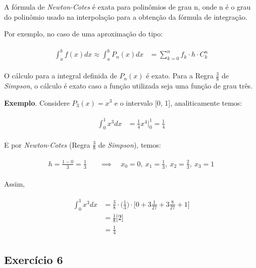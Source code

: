 \documentclass[paper=a4, fontsize=12pt]{scrartcl}
\numberwithin{equation}{section} %
\numberwithin{figure}{section} %
\numberwithin{table}{section} %
\begin{document}
		A fórmula de \textit{Newton-Cotes} é exata para polinômios de grau n, onde n é o grau do polinômio usado na interpolação para a obtenção da fórmula de integração.

		Por exemplo, no caso de uma aproximação do tipo:

		\begin{align*}
			\begin{split}
				\int_{a}^{b} f(x) dx \approx \int_{a}^{b} P_n(x) dx &= \sum_{k=0}^{n} f_k \cdot h \cdot C_k^n
			\end{split}
		\end{align*}

		O cálculo para a integral definida de $P_n(x)$ é exato. Para a Regra $ \frac{3}{8} $ de \textit{Simpson}, o cálculo é exato caso a função utilizada seja uma função de grau três.

		\textbf{Exemplo}. Considere $P_3(x) = x^3$ e o intervalo [0, 1], analiticamente temos:

		\begin{align*}
			\begin{split}
				\int_{0}^{1} x^3 dx &= \frac{1}{4}x^4 \Big|_0^1 = \frac{1}{4}
			\end{split}
		\end{align*}

		E por \textit{Newton-Cotes} (Regra $ \frac{3}{8} $ de \textit{Simpson}), temos:

		\begin{align*}
			\begin{split}
				h = \frac{1 - 0}{3} = \frac{1}{3} \quad &\implies \quad x_0 = 0,\ x_1 = \frac{1}{3},\ x_2 = \frac{2}{3},\ x_3 = 1
			\end{split}
		\end{align*}

		Assim,

		\begin{align*}
			\begin{split}
				\int_{0}^{1} x^3 dx &= \frac{3}{8} \cdot \Big(\frac{1}{3}\Big) \cdot \Big[0 + 3\frac{1}{27} + 3\frac{8}{27} + 1\Big] \\
				&= \frac{1}{8} \Big[  2 \Big] \\
				&= \frac{1}{4}
			\end{split}
		\end{align*}

		\subsection{Exercício 6}
\end{document}

